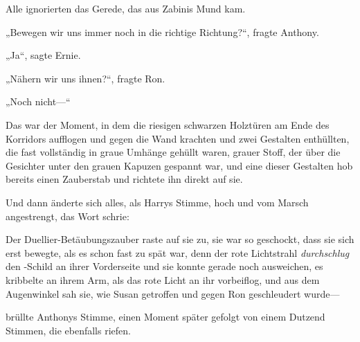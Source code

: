 Alle ignorierten das Gerede, das aus Zabinis Mund kam.

„Bewegen wir uns immer noch in die richtige Richtung?“, fragte Anthony.

„Ja“, sagte Ernie.

„Nähern wir uns ihnen?“, fragte Ron.

„Noch nicht—“

Das war der Moment, in dem die riesigen schwarzen Holztüren am Ende des Korridors aufflogen und gegen die Wand krachten und zwei Gestalten enthüllten, die fast vollständig in graue Umhänge gehüllt waren, grauer Stoff, der über die Gesichter unter den grauen Kapuzen gespannt war, und eine dieser Gestalten hob bereits einen Zauberstab und richtete ihn direkt auf sie.

Und dann änderte sich alles, als Harrys Stimme, hoch und vom Marsch angestrengt, das Wort schrie:


Der Duellier-Betäubungszauber raste auf sie zu, sie war so geschockt, dass sie sich erst bewegte, als es schon fast zu spät war, denn der rote Lichtstrahl \emph{durchschlug} den -Schild an ihrer Vorderseite und sie konnte gerade noch ausweichen, es kribbelte an ihrem Arm, als das rote Licht an ihr vorbeiflog, und aus dem Augenwinkel sah sie, wie Susan getroffen und gegen Ron geschleudert wurde—

 brüllte Anthonys Stimme, einen Moment später gefolgt von einem Dutzend Stimmen, die ebenfalls  riefen.

